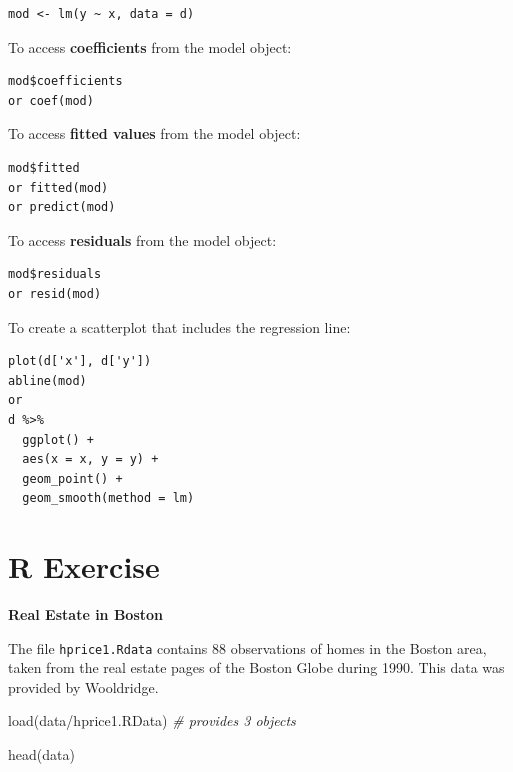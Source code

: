 \documentclass[
]{book}
\newenvironment{Shaded}{\begin{snugshade}}{\end{snugshade}}
\newcommand{\CommentTok}[1]{\textcolor[rgb]{0.56,0.35,0.01}{\textit{#1}}}
\newcommand{\FunctionTok}[1]{\textcolor[rgb]{0.00,0.00,0.00}{#1}}
\newcommand{\NormalTok}[1]{#1}
\newcommand{\StringTok}[1]{\textcolor[rgb]{0.31,0.60,0.02}{#1}}
\theoremstyle{definition}
\theoremstyle{definition}
\theoremstyle{definition}
\theoremstyle{definition}
\theoremstyle{remark}
\begin{document}
\begin{verbatim}
mod <- lm(y ~ x, data = d)
\end{verbatim}

To access \textbf{coefficients} from the model object:

\begin{verbatim}
mod$coefficients
or coef(mod)
\end{verbatim}

To access \textbf{fitted values} from the model object:

\begin{verbatim}
mod$fitted
or fitted(mod)
or predict(mod)
\end{verbatim}

To access \textbf{residuals} from the model object:

\begin{verbatim}
mod$residuals
or resid(mod)
\end{verbatim}

To create a scatterplot that includes the regression line:

\begin{verbatim}
plot(d['x'], d['y'])
abline(mod)
or 
d %>% 
  ggplot() + 
  aes(x = x, y = y) + 
  geom_point() + 
  geom_smooth(method = lm)
\end{verbatim}

\hypertarget{r-exercise}{%
\section{R Exercise}\label{r-exercise}}

\textbf{Real Estate in Boston}

The file \texttt{hprice1.Rdata} contains 88 observations of homes in the Boston area, taken from the real estate pages of the Boston Globe during 1990. This data was provided by Wooldridge.

\begin{Shaded}
\begin{Highlighting}[]
\FunctionTok{load}\NormalTok{(}\StringTok{\textquotesingle{}data/hprice1.RData\textquotesingle{}}\NormalTok{) }\CommentTok{\# provides 3 objects }
\end{Highlighting}
\end{Shaded}

\begin{Shaded}
\begin{Highlighting}[]
\FunctionTok{head}\NormalTok{(data)}
\end{Highlighting}
\end{Shaded}
\end{document}
